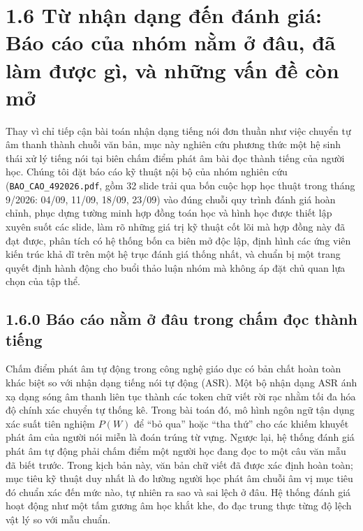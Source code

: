 \documentclass[11pt,a4paper]{article}
\begin{document}
\section*{1.6 Từ nhận dạng đến đánh giá: Báo cáo của nhóm nằm ở đâu, đã làm được gì, và những vấn đề còn mở}

\begin{learningobj}
Thay vì chỉ tiếp cận bài toán nhận dạng tiếng nói đơn thuần như việc chuyển tự âm thanh thành chuỗi văn bản, mục này nghiên cứu phương thức một hệ sinh thái xử lý tiếng nói tại biên chấm điểm phát âm bài đọc thành tiếng của người học. Chúng tôi đặt báo cáo kỹ thuật nội bộ của nhóm nghiên cứu (\texttt{BAO\_CAO\_492026.pdf}, gồm 32 slide trải qua bốn cuộc họp học thuật trong tháng 9/2026: 04/09, 11/09, 18/09, 23/09) vào đúng chuỗi quy trình đánh giá hoàn chỉnh, phục dựng tường minh hợp đồng toán học và hình học được thiết lập xuyên suốt các slide, làm rõ những giá trị kỹ thuật cốt lõi mà hợp đồng này đã đạt được, phân tích có hệ thống bốn ca biên mở độc lập, định hình các ứng viên kiến trúc khả dĩ trên một hệ trục đánh giá thống nhất, và chuẩn bị một trang quyết định hành động cho buổi thảo luận nhóm mà không áp đặt chủ quan lựa chọn của tập thể.
\end{learningobj}

\subsection*{1.6.0 Báo cáo nằm ở đâu trong chấm đọc thành tiếng}

Chấm điểm phát âm tự động trong công nghệ giáo dục có bản chất hoàn toàn khác biệt so với nhận dạng tiếng nói tự động (ASR). Một bộ nhận dạng ASR ánh xạ dạng sóng âm thanh liên tục thành các token chữ viết rời rạc nhằm tối đa hóa độ chính xác chuyển tự thống kê. Trong bài toán đó, mô hình ngôn ngữ tận dụng xác suất tiên nghiệm $P(W)$ để ``bỏ qua'' hoặc ``tha thứ'' cho các khiếm khuyết phát âm của người nói miễn là đoán trúng từ vựng. Ngược lại, hệ thống đánh giá phát âm tự động phải chấm điểm một người học đang đọc to một câu văn mẫu đã biết trước. Trong kịch bản này, văn bản chữ viết đã được xác định hoàn toàn; mục tiêu kỹ thuật duy nhất là đo lường người học phát âm chuỗi âm vị mục tiêu đó chuẩn xác đến mức nào, tự nhiên ra sao và sai lệch ở đâu. Hệ thống đánh giá hoạt động như một tấm gương âm học khắt khe, đo đạc trung thực từng độ lệch vật lý so với mẫu chuẩn.
\end{document}
